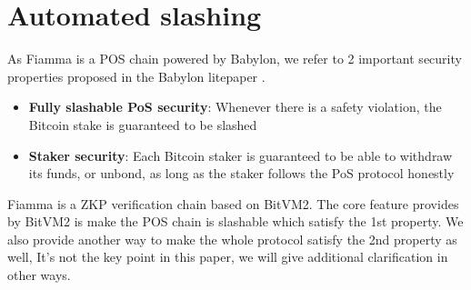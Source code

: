 \section{Automated slashing} \label{sec:automated-slashing}

As Fiamma is a POS chain powered by Babylon, we refer to 2 important security properties proposed in the Babylon litepaper \cite{website:litepaper}.

\begin{itemize}
    \item \textbf{Fully slashable PoS security}:  Whenever there is a safety violation, the Bitcoin stake is guaranteed to be slashed
    \item \textbf{Staker security}: Each Bitcoin staker is guaranteed to be able to withdraw its funds, or unbond, as long as the staker follows the PoS protocol honestly
\end{itemize}

Fiamma is a ZKP verification chain based on BitVM2. The core feature provides by BitVM2 is make the POS chain is slashable which satisfy the 1st property.
We also provide another way to make the whole protocol satisfy the 2nd property as well, It's not the key point in this paper, we will give additional clarification
in other ways.


